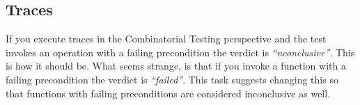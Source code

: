 \documentclass[11pt]{report}
\begin{document}
\subsection*{Traces }

If you execute traces in the Combinatorial Testing perspective and the test invokes an operation with a failing precondition the verdict is \textit{``nconclusive''}. This is how it should be. What seems strange, is that if you invoke a function with a failing precondition the verdict is \textit{``failed''}. This task suggests changing this so that functions with failing preconditions are considered inconclusive as well.
\end{document}
